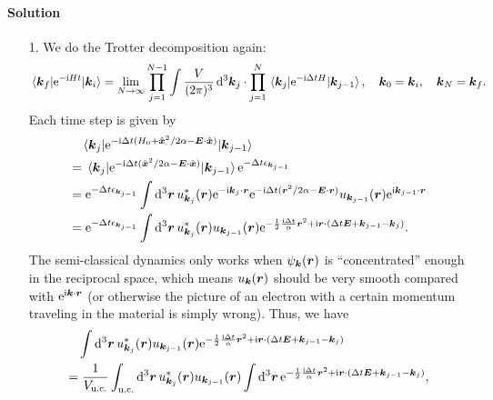 \documentclass[hyperref, a4paper]{article}
\newcommand*{\ii}{\mathrm{i}}
\newcommand*{\ee}{\mathrm{e}}
\begin{document}
\paragraph{Solution} \begin{itemize}
\item[1.] We do the Trotter decomposition again:
\[
    \mel{\vb*{k}_f}{\ee^{- \ii H t}}{\vb*{k}_i} = \lim_{N \to \infty}
    \prod_{j=1}^{N-1} \int \frac{V}{(2\pi)^3} \dd[3]{\vb*{k}_j} \cdot \prod_{j=1}^{N} 
    \mel{\vb*{k}_j}{\ee^{- \ii \Delta t H}}{\vb*{k}_{j-1}}, \quad 
    \vb*{k}_{0} = \vb*{k}_i, \quad \vb*{k}_N = \vb*{k}_f.
\]
Each time step is given by 
\[
    \begin{aligned}
        &\quad \mel{\vb*{k}_j}{\ee^{- \ii \Delta t (H_0 + \hat{\vb*{x}}^2 / 2 \alpha - \vb*{E} \cdot \hat{\vb*{x}})}}{\vb*{k}_{j-1}} \\
        &= \mel{\vb*{k}_j}{\ee^{- \ii \Delta t ( \hat{\vb*{x}}^2 / 2 \alpha - \vb*{E} \cdot \hat{\vb*{x}})}}{\vb*{k}_{j-1}} \ee^{- \Delta t \epsilon_{\vb*{k}_{j-1}}} \\
        &= \ee^{- \Delta t \epsilon_{\vb*{k}_{j-1}}} \int \dd[3]{\vb*{r}} u^*_{\vb*{k}_j}(\vb*{r}) \ee^{- \ii \vb*{k}_j \cdot \vb*{r}}
        \ee^{- \ii \Delta t (\vb*{r}^2 / 2\alpha - \vb*{E} \cdot \vb*{r})} u_{\vb*{k}_{j-1}}(\vb*{r}) \ee^{\ii \vb*{k}_{j-1} \cdot \vb*{r}} \\
        &= \ee^{- \Delta t \epsilon_{\vb*{k}_{j-1}}} \int \dd[3]{\vb*{r}} u^*_{\vb*{k}_{j}}(\vb*{r}) u_{\vb*{k}_{j-1}}(\vb*{r})
        \ee^{- \frac{1}{2} \frac{\ii \Delta t}{\alpha} \vb*{r}^2 + \ii \vb*{r} \cdot (\Delta t \vb*{E} + \vb*{k}_{j-1} - \vb*{k}_j) }.
    \end{aligned}
\]
The semi-classical dynamics only works when $\psi_{\vb*{k}}(\vb*{r})$ is 
``concentrated'' enough in the reciprocal space,
which means $u_{\vb*{k}}(\vb*{r})$ should be very smooth compared with $\ee^{\ii \vb*{k} \cdot \vb*{r}}$
(or otherwise the picture of an electron with a certain momentum traveling in the material is simply wrong).
Thus, we have 
\[
    \begin{aligned}
        &\quad \int \dd[3]{\vb*{r}} u^*_{\vb*{k}_{j}}(\vb*{r}) u_{\vb*{k}_{j-1}}(\vb*{r})
        \ee^{- \frac{1}{2} \frac{\ii \Delta t}{\alpha} \vb*{r}^2 + \ii \vb*{r} \cdot (\Delta t \vb*{E} + \vb*{k}_{j-1} - \vb*{k}_j) } \\
        &= \frac{1}{V_{\text{u.c.}}} \int_{\text{u.c.}} \dd[3]{\vb*{r}}
        u^*_{\vb*{k}_{j}}(\vb*{r}) u_{\vb*{k}_{j-1}}(\vb*{r})
        \int \dd[3]{\vb*{r}} \ee^{- \frac{1}{2} \frac{\ii \Delta t}{\alpha} \vb*{r}^2 + \ii \vb*{r} \cdot (\Delta t \vb*{E} + \vb*{k}_{j-1} - \vb*{k}_j) } ,

\end{aligned}\]
\end{itemize}
\end{document}
